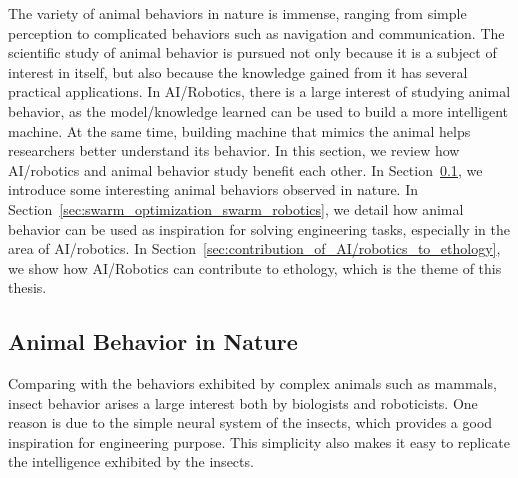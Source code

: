 The variety of animal behaviors in nature is immense, ranging from simple perception to complicated behaviors such as navigation and communication. The scientific study of animal behavior is pursued not only because it is a subject of interest in itself, but also because the knowledge gained from it has several practical applications. In AI/Robotics, there is a large interest of studying animal behavior, as the model/knowledge learned can be used to build a more intelligent machine. At the same time, building machine that mimics the animal helps researchers better understand its behavior. In this section, we review how AI/robotics and animal behavior study benefit each other. In Section~\ref{sec:animal_behavior_in_nature}, we introduce some interesting animal behaviors observed in nature. In Section~\ref{sec:swarm_optimization_swarm_robotics}, we detail how animal behavior can be used as inspiration for solving engineering tasks, especially in the area of AI/robotics. In Section~\ref{sec:contribution_of_AI/robotics_to_ethology}, we show how AI/Robotics can contribute to ethology, which is the theme of this thesis.

\subsection{Animal Behavior in Nature}\label{sec:animal_behavior_in_nature}

Comparing with the behaviors exhibited by complex animals such as mammals, insect behavior arises a large interest both by biologists and roboticists. One reason is due to the simple neural system of the insects, which provides a good inspiration for engineering purpose. This simplicity also makes it easy to replicate the intelligence exhibited by the insects. 



